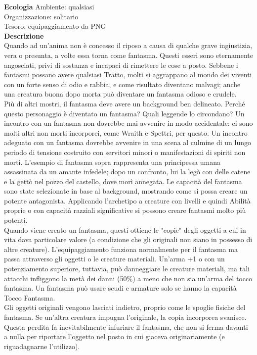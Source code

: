 \begin{multicols}{2}
\textbf{Ecologia}
Ambiente: qualsiasi\\
Organizzazione: solitario\\
Tesoro: equipaggiamento da PNG\\
\textbf{Descrizione}\\
Quando ad un'anima non è concesso il riposo a causa di qualche grave ingiustizia, vera o presunta, a volte essa torna come fantasma. Questi esseri sono eternamente angosciati, privi di sostanza e incapaci di rimettere le cose a posto. Sebbene i fantasmi possano avere qualsiasi Tratto, molti si aggrappano al mondo dei viventi con un forte senso di odio e rabbia, e come risultato diventano  malvagi; anche una creatura buona dopo morta può diventare un fantasma odioso e crudele.\\

Più di altri mostri, il fantasma deve avere un background ben delineato. Perché questo personaggio è diventato un fantasma? Quali leggende lo circondano? Un incontro con un fantasma non dovrebbe mai avvenire in modo accidentale: ci sono molti altri non morti incorporei, come Wraith e Spettri, per questo. Un incontro adeguato con un fantasma dovrebbe avvenire in una scena al culmine di un lungo periodo di tensione costruito con servitori minori o manifestazioni di spiriti non morti. L'esempio di fantasma sopra rappresenta una principessa umana assassinata da un amante infedele; dopo un confronto, lui la legò con delle catene e la gettò nel pozzo del castello, dove morì annegata. Le capacità del fantasma sono state selezionate in base al background, mostrando come si possa creare un potente antagonista. Applicando l'archetipo a creature con livelli e quindi Abilità proprie o con capacità razziali significative si possono creare fantasmi molto più potenti.\\

Quando viene creato un fantasma, questi ottiene le "copie" degli oggetti a cui in vita dava particolare valore (a condizione che gli originali non siano in possesso di altre creature). L'equipaggiamento funziona normalmente per il fantasma ma passa attraverso gli oggetti o le creature materiali. Un'arma +1 o con un potenziamento superiore, tuttavia, può danneggiare le creature materiali, ma tali attacchi infliggono la metà dei danni (50\%) a meno che non sia un'arma del tocco fantasma. Un fantasma può usare scudi e armature solo se hanno la capacità Tocco Fantasma.\\

Gli oggetti originali vengono lasciati indietro, proprio come le spoglie fisiche del fantasma. Se un'altra creatura impugna l'originale, la copia incorporea svanisce. Questa perdita fa inevitabilmente infuriare il fantasma, che non si ferma davanti a nulla per riportare l'oggetto nel posto in cui giaceva originariamente (e riguadagnarne l'utilizzo).\\



\end{multicols}
